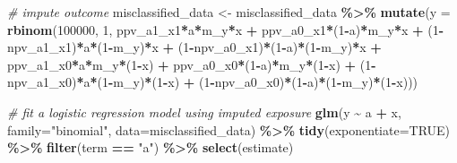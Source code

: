 \documentclass[
]{book}
\newenvironment{Shaded}{\begin{snugshade}}{\end{snugshade}}
\newcommand{\AttributeTok}[1]{\textcolor[rgb]{0.13,0.29,0.53}{#1}}
\newcommand{\CommentTok}[1]{\textcolor[rgb]{0.56,0.35,0.01}{\textit{#1}}}
\newcommand{\ConstantTok}[1]{\textcolor[rgb]{0.56,0.35,0.01}{#1}}
\newcommand{\DecValTok}[1]{\textcolor[rgb]{0.00,0.00,0.81}{#1}}
\newcommand{\FunctionTok}[1]{\textcolor[rgb]{0.13,0.29,0.53}{\textbf{#1}}}
\newcommand{\NormalTok}[1]{#1}
\newcommand{\OtherTok}[1]{\textcolor[rgb]{0.56,0.35,0.01}{#1}}
\newcommand{\SpecialCharTok}[1]{\textcolor[rgb]{0.81,0.36,0.00}{\textbf{#1}}}
\newcommand{\StringTok}[1]{\textcolor[rgb]{0.31,0.60,0.02}{#1}}
\begin{document}
\begin{Shaded}
\begin{Highlighting}[]
\CommentTok{\# impute outcome}
\NormalTok{misclassified\_data }\OtherTok{\textless{}{-}}\NormalTok{ misclassified\_data }\SpecialCharTok{\%\textgreater{}\%} \FunctionTok{mutate}\NormalTok{(}\AttributeTok{y =} \FunctionTok{rbinom}\NormalTok{(}\DecValTok{100000}\NormalTok{, }\DecValTok{1}\NormalTok{, ppv\_a1\_x1}\SpecialCharTok{*}\NormalTok{a}\SpecialCharTok{*}\NormalTok{m\_y}\SpecialCharTok{*}\NormalTok{x }\SpecialCharTok{+}\NormalTok{ ppv\_a0\_x1}\SpecialCharTok{*}\NormalTok{(}\DecValTok{1}\SpecialCharTok{{-}}\NormalTok{a)}\SpecialCharTok{*}\NormalTok{m\_y}\SpecialCharTok{*}\NormalTok{x }\SpecialCharTok{+}\NormalTok{ (}\DecValTok{1}\SpecialCharTok{{-}}\NormalTok{npv\_a1\_x1)}\SpecialCharTok{*}\NormalTok{a}\SpecialCharTok{*}\NormalTok{(}\DecValTok{1}\SpecialCharTok{{-}}\NormalTok{m\_y)}\SpecialCharTok{*}\NormalTok{x }\SpecialCharTok{+}\NormalTok{ (}\DecValTok{1}\SpecialCharTok{{-}}\NormalTok{npv\_a0\_x1)}\SpecialCharTok{*}\NormalTok{(}\DecValTok{1}\SpecialCharTok{{-}}\NormalTok{a)}\SpecialCharTok{*}\NormalTok{(}\DecValTok{1}\SpecialCharTok{{-}}\NormalTok{m\_y)}\SpecialCharTok{*}\NormalTok{x }\SpecialCharTok{+}\NormalTok{ ppv\_a1\_x0}\SpecialCharTok{*}\NormalTok{a}\SpecialCharTok{*}\NormalTok{m\_y}\SpecialCharTok{*}\NormalTok{(}\DecValTok{1}\SpecialCharTok{{-}}\NormalTok{x) }\SpecialCharTok{+}\NormalTok{ ppv\_a0\_x0}\SpecialCharTok{*}\NormalTok{(}\DecValTok{1}\SpecialCharTok{{-}}\NormalTok{a)}\SpecialCharTok{*}\NormalTok{m\_y}\SpecialCharTok{*}\NormalTok{(}\DecValTok{1}\SpecialCharTok{{-}}\NormalTok{x) }\SpecialCharTok{+}\NormalTok{ (}\DecValTok{1}\SpecialCharTok{{-}}\NormalTok{npv\_a1\_x0)}\SpecialCharTok{*}\NormalTok{a}\SpecialCharTok{*}\NormalTok{(}\DecValTok{1}\SpecialCharTok{{-}}\NormalTok{m\_y)}\SpecialCharTok{*}\NormalTok{(}\DecValTok{1}\SpecialCharTok{{-}}\NormalTok{x) }\SpecialCharTok{+}\NormalTok{ (}\DecValTok{1}\SpecialCharTok{{-}}\NormalTok{npv\_a0\_x0)}\SpecialCharTok{*}\NormalTok{(}\DecValTok{1}\SpecialCharTok{{-}}\NormalTok{a)}\SpecialCharTok{*}\NormalTok{(}\DecValTok{1}\SpecialCharTok{{-}}\NormalTok{m\_y)}\SpecialCharTok{*}\NormalTok{(}\DecValTok{1}\SpecialCharTok{{-}}\NormalTok{x)))}

\CommentTok{\# fit a logistic regression model using imputed exposure}
\FunctionTok{glm}\NormalTok{(y }\SpecialCharTok{\textasciitilde{}}\NormalTok{ a }\SpecialCharTok{+}\NormalTok{ x, }\AttributeTok{family=}\StringTok{"binomial"}\NormalTok{, }\AttributeTok{data=}\NormalTok{misclassified\_data) }\SpecialCharTok{\%\textgreater{}\%} 
  \FunctionTok{tidy}\NormalTok{(}\AttributeTok{exponentiate=}\ConstantTok{TRUE}\NormalTok{) }\SpecialCharTok{\%\textgreater{}\%} \FunctionTok{filter}\NormalTok{(term }\SpecialCharTok{==} \StringTok{"a"}\NormalTok{) }\SpecialCharTok{\%\textgreater{}\%} \FunctionTok{select}\NormalTok{(estimate)}
\end{Highlighting}
\end{Shaded}
\end{document}
